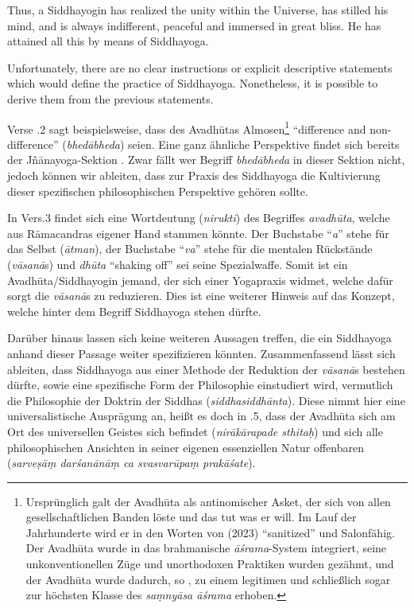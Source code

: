 Thus, a Siddhayogin has realized the unity within the Universe, has stilled his mind, and is always indifferent, peaceful and immersed in great bliss. He has attained all this by means of Siddhayoga.

Unfortunately, there are no clear instructions or explicit descriptive statements which would define the practice of Siddhayoga. Nonetheless, it is possible to derive them from the previous statements.

Verse .2 sagt beispielsweise, dass des Avadhūtas Almosen\footnote{Ursprünglich galt der Avadhūta als antinomischer Asket, der sich von allen gesellschaftlichen Banden löste und das tut was er will. Im Lauf der Jahrhunderte wird er in den Worten von \citeauthor{pudi2023} (2023) ``sanitized'' und Salonfähig. Der Avadhūta wurde in das brahmanische \textit{āśrama}-System integriert, seine unkonventionellen Züge und unorthodoxen Praktiken wurden gezähmt, und der Avadhūta wurde dadurch, so \citeauthor{pudi2023}, zu einem legitimen und schließlich sogar zur höchsten Klasse des \textit{saṃnyāsa āśrama} erhoben.} ``difference and non-difference'' (\textit{bhedābheda}) seien. Eine ganz ähnliche Perspektive findet sich bereits der Jñānayoga-Sektion . Zwar fällt wer Begriff \textit{bhedābheda} in dieser Sektion nicht, jedoch können wir ableiten, dass zur Praxis des Siddhayoga die Kultivierung dieser spezifischen philosophischen Perspektive gehören sollte.

In Vers.3 findet sich eine Wortdeutung (\textit{nirukti}) des Begriffes \textit{avadhūta}, welche aus Rāmacandras eigener Hand stammen könnte. Der Buchstabe ``\textit{a}'' stehe für das Selbst (\textit{ātman}), der Buchstabe ``\textit{va}'' stehe für die mentalen Rückstände (\textit{vāsanā}s) und \textit{dhūta} ``shaking off'' sei seine Spezialwaffe. Somit ist ein Avadhūta/Siddhayogin jemand, der sich einer Yogapraxis widmet, welche dafür sorgt die \textit{vāsanā}s zu reduzieren. Dies ist eine weiterer Hinweis auf das Konzept, welche hinter dem Begriff Siddhayoga stehen dürfte.

Darüber hinaus lassen sich keine weiteren Aussagen treffen, die ein Siddhayoga anhand dieser Passage weiter spezifizieren könnten. Zusammenfassend lässt sich ableiten, dass Siddhayoga aus einer Methode der Reduktion der \textit{vāsanā}s bestehen dürfte, sowie eine spezifische Form der Philosophie einstudiert wird, vermutlich die Philosophie der Doktrin der Siddhas (\textit{siddhasiddhānta}). Diese nimmt hier eine universalistische Ausprägung an, heißt es doch in .5, dass der Avadhūta sich am Ort des universellen Geistes sich befindet (\textit{nirākārapade sthitaḥ}) und sich alle philosophischen Ansichten in seiner eigenen essenziellen Natur offenbaren (\textit{sarveṣāṃ darśanānāṃ ca svasvarūpaṃ prakāśate}). 

